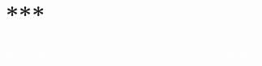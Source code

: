 \documentclass[\ifafour a4paper,12pt,\else a5paper,10pt,\fi%
onecolumn,oneside,article,%
british%
]{memoir}
\title{\propertitle}
\author{%
\hspace*{\stretch{1}}%
\parbox{0.5\linewidth}%
{\protect\centering P.G.L.  Porta Mana\\%
\footnotesize\epost{\email{piero.mana}{ntnu.no}}}%
\hspace*{\stretch{1}}%
}
\date{\firstpublished; updated \updated}
\theoremstyle{remark}
\theoremstyle{innote}
\newcommand*{\amp}{\&}
\newcommand*{\asudedication}[1]{%
{\par\centering\textit{#1}\par}}
\renewcommand*{\|}[1][]{\nonscript\,#1\vert\nonscript\;\mathopen{}}
\newcommand*{\pdo}{\textit{do}}
\begin{document}
\captiondelim{\quad}\captionnamefont{\footnotesize}\captiontitlefont{\footnotesize}
\frenchspacing
\maketitle

\abstractrunin
\abslabeldelim{}
\renewcommand*{\abstractname}{}
\setlength{\absleftindent}{0pt}
\setlength{\absrightindent}{0pt}
\setlength{\abstitleskip}{-\absparindent}
\begin{abstract}%
  \noindent A comment on probability theory, causality, and Pearl's
  notation \enquote{$\pdo(x)$}.
\\\noindent\emph{\footnotesize Note: Dear Reader
    \amp\ Peer, this manuscript is being peer-reviewed by you. Thank you.}
\end{abstract}
\frenchspacing





\section{***}
\label{sec:***}

\textcolor{white}{If you find this you can claim a postcard from me.}
\end{document}
